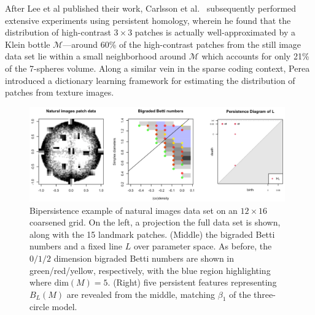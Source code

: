 \documentclass[sn-mathphys]{sn-jnl}
\begin{document}
After Lee et al published their work, Carlsson et al.~\cite{carlsson2008local} subsequently performed extensive experiments using persistent homology, wherein he found that the distribution of high-contrast $3 \times 3$ patches is actually well-approximated by a Klein bottle $\mathcal{M}$---around 60\% of the high-contrast patches from the still image data set lie within a small neighborhood around $\mathcal{M}$ which accounts for only 21\% of the 7-spheres volume. Along a similar vein in the sparse coding context, Perea~\cite{perea2014klein} introduced a dictionary learning framework for estimating the distribution of patches from texture images. 

 \begin{figure}[t]
	\includegraphics[width=0.98\textwidth]{natural_images}
	\caption{Bipersistence example of natural images data set on an $12 \times 16$ coarsened grid. On the left, a projection the full data set is shown, along with the 15 landmark patches. (Middle) the bigraded Betti numbers and a fixed line $L$ over parameter space. 
	As before, the $0/1/2$ dimension bigraded Betti numbers are shown in green/red/yellow, respectively, with the blue region highlighting where $\mathrm{dim}(M) = 5$. (Right) five persistent features representing $B_L(M)$ are revealed from the middle, matching $\beta_1$ of the three-circle model. }
	\label{fig:patch_data_dgm}
\end{figure}
\end{document}
